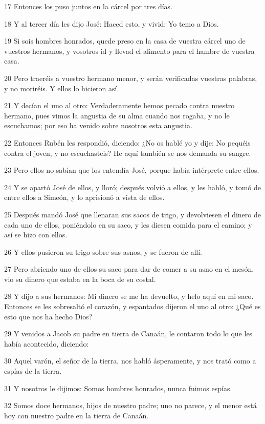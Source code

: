 \par 17 Entonces los puso juntos en la cárcel por tres días.
\par 18 Y al tercer día les dijo José: Haced esto, y vivid: Yo temo a Dios.
\par 19 Si sois hombres honrados, quede preso en la casa de vuestra cárcel uno de vuestros hermanos, y vosotros id y llevad el alimento para el hambre de vuestra casa.
\par 20 Pero traeréis a vuestro hermano menor, y serán verificadas vuestras palabras, y no moriréis. Y ellos lo hicieron así.
\par 21 Y decían el uno al otro: Verdaderamente hemos pecado contra nuestro hermano, pues vimos la angustia de su alma cuando nos rogaba, y no le escuchamos; por eso ha venido sobre nosotros esta angustia.
\par 22 Entonces Rubén les respondió, diciendo: ¿No os hablé yo y dije: No pequéis contra el joven, y no escuchasteis? He aquí también se nos demanda su sangre.
\par 23 Pero ellos no sabían que los entendía José, porque había intérprete entre ellos.
\par 24 Y se apartó José de ellos, y lloró; después volvió a ellos, y les habló, y tomó de entre ellos a Simeón, y lo aprisionó a vista de ellos.
\par 25 Después mandó José que llenaran sus sacos de trigo, y devolviesen el dinero de cada uno de ellos, poniéndolo en su saco, y les diesen comida para el camino; y así se hizo con ellos.
\par 26 Y ellos pusieron su trigo sobre sus asnos, y se fueron de allí.
\par 27 Pero abriendo uno de ellos su saco para dar de comer a su asno en el mesón, vio su dinero que estaba en la boca de su costal.
\par 28 Y dijo a sus hermanos: Mi dinero se me ha devuelto, y helo aquí en mi saco. Entonces se les sobresaltó el corazón, y espantados dijeron el uno al otro: ¿Qué es esto que nos ha hecho Dios?
\par 29 Y venidos a Jacob su padre en tierra de Canaán, le contaron todo lo que les había acontecido, diciendo:
\par 30 Aquel varón, el señor de la tierra, nos habló ásperamente, y nos trató como a espías de la tierra.
\par 31 Y nosotros le dijimos: Somos hombres honrados, nunca fuimos espías.
\par 32 Somos doce hermanos, hijos de nuestro padre; uno no parece, y el menor está hoy con nuestro padre en la tierra de Canaán.
